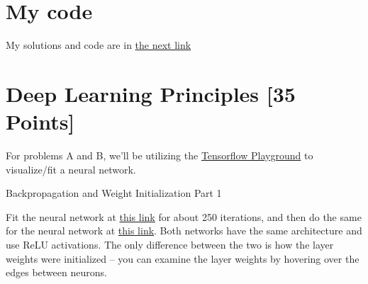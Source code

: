 \newif\ifshowsolutions
\showsolutionstrue







\pagestyle{fancy}




\newpage
\section{My code}
My solutions and code are in   \href{https://drive.google.com/drive/folders/100BU9aX5GGRsIe0h5_QuuEcg0FLf8EC_?usp=sharing}{the next link}
\section{Deep Learning Principles [35 Points]}

For problems A and B, we'll be utilizing the \href{http://playground.tensorflow.org/}{Tensorflow Playground} to visualize/fit a neural network.

\begin{problem}[5]
  Backpropagation and Weight Initialization Part 1
\end{problem}

Fit the neural network at \href{http://playground.tensorflow.org/#activation=relu&batchSize=10&dataset=circle&regDataset=reg-plane&learningRate=0.03&regularizationRate=0&noise=0&networkShape=4,2&seed=0.65409&showTestData=false&discretize=false&percTrainData=50&x=true&y=true&xTimesY=false&xSquared=false&ySquared=false&cosX=false&sinX=false&cosY=false&sinY=false&collectStats=false&problem=classification&initZero=false&hideText=false}{this link} for about 250 iterations, and then do the same for the neural network at  \href{http://playground.tensorflow.org/#activation=relu&batchSize=10&dataset=circle&regDataset=reg-plane&learningRate=0.03&regularizationRate=0&noise=0&networkShape=4,2&seed=0.6&showTestData=false&discretize=false&percTrainData=50&x=true&y=true&xTimesY=false&xSquared=false&ySquared=false&cosX=false&sinX=false&cosY=false&sinY=false&collectStats=false&problem=classification&initZero=true&hideText=false}{this link}.  Both networks have the same architecture and use ReLU activations.  The only difference between the two is how the layer weights were initialized -- you can examine the layer weights by hovering over the edges between neurons.

